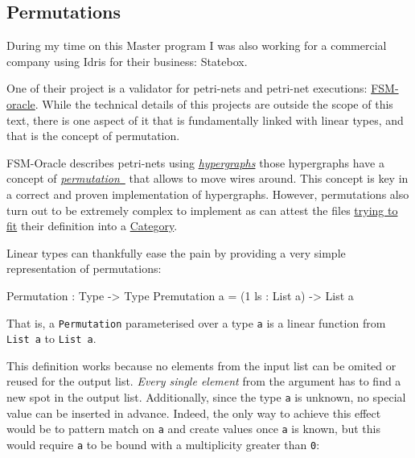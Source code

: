 \documentclass[
]{article}
\newenvironment{Shaded}{}{}
\newcommand{\DataTypeTok}[1]{\textcolor[rgb]{0.56,0.13,0.00}{#1}}
\newcommand{\DecValTok}[1]{\textcolor[rgb]{0.25,0.63,0.44}{#1}}
\newcommand{\NormalTok}[1]{#1}
\newcommand{\OperatorTok}[1]{\textcolor[rgb]{0.40,0.40,0.40}{#1}}
\newcommand{\OtherTok}[1]{\textcolor[rgb]{0.00,0.44,0.13}{#1}}
\begin{document}
\hypertarget{permutations}{%
\subsection{Permutations}\label{permutations}}

During my time on this Master program I was also working for a
commercial company using Idris for their business: Statebox.

One of their project is a validator for petri-nets and petri-net
executions: \href{https://github.com/statebox/fsm-oracle}{FSM-oracle}.
While the technical details of this projects are outside the scope of
this text, there is one aspect of it that is fundamentally linked with
linear types, and that is the concept of permutation.

FSM-Oracle describes petri-nets using
\href{http://www.zanasi.com/fabio/files/paperCALCO19b.pdf}{\emph{hypergraphs}}
those hypergraphs have a concept of
\href{https://github.com/statebox/fsm-oracle/blob/master/src/Permutations/Permutations.idr\#L31}{\emph{permutation}~}
that allows to move wires around. This concept is key in a correct and
proven implementation of hypergraphs. However, permutations also turn
out to be extremely complex to implement as can attest the files
\href{https://github.com/statebox/fsm-oracle/blob/master/src/Permutations/PermutationsCategory.idr}{trying
to fit} their definition into a
\href{https://github.com/statebox/fsm-oracle/blob/master/src/Permutations/PermutationsStrictMonoidalCategory.idr}{Category}.

Linear types can thankfully ease the pain by providing a very simple
representation of permutations:

\begin{Shaded}
\begin{Highlighting}[]
\DataTypeTok{Permutation} \OperatorTok{:} \DataTypeTok{Type} \OtherTok{{-}\textgreater{}} \DataTypeTok{Type}
\DataTypeTok{Premutation}\NormalTok{ a }\OtherTok{=}\NormalTok{ (}\DecValTok{1}\NormalTok{ ls }\OperatorTok{:} \DataTypeTok{List}\NormalTok{ a) }\OtherTok{{-}\textgreater{}} \DataTypeTok{List}\NormalTok{ a}
\end{Highlighting}
\end{Shaded}

That is, a \texttt{Permutation} parameterised over a type \texttt{a} is
a linear function from \texttt{List\ a} to \texttt{List\ a}.

This definition works because no elements from the input list can be
omited or reused for the output list. \emph{Every single element} from
the argument has to find a new spot in the output list. Additionally,
since the type \texttt{a} is unknown, no special value can be inserted
in advance. Indeed, the only way to achieve this effect would be to
pattern match on \texttt{a} and create values once \texttt{a} is known,
but this would require \texttt{a} to be bound with a multiplicity
greater than \texttt{0}:
\end{document}

